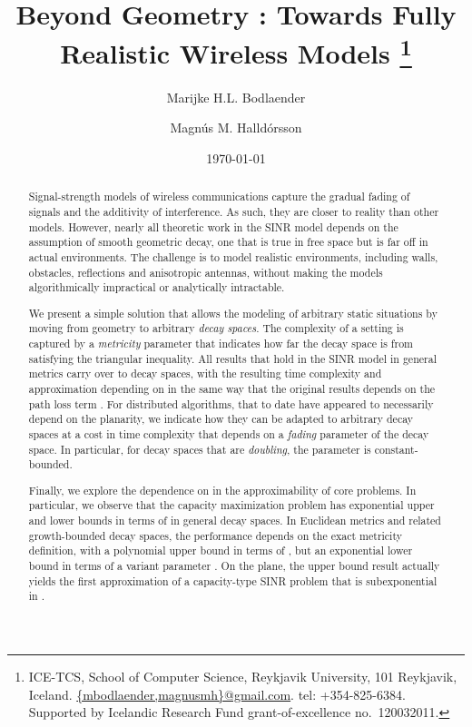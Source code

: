 \documentclass[11pt]{amsart}
\title{Beyond Geometry : Towards Fully Realistic Wireless Models
\thanks{ICE-TCS, School of Computer Science, Reykjavik University, 101 Reykjavik, Iceland. \url{
\{mbodlaender,magnusmh\}@gmail.com}. tel: +354-825-6384.
Supported by Icelandic Research Fund grant-of-excellence no.~120032011.}}
\author{Marijke H.L. Bodlaender \and Magn\'us M. Halld\'orsson}
\begin{document}
\begin{titlepage}

\date{\today}
\thispagestyle{empty}

\begin{abstract}
Signal-strength models of wireless communications capture the gradual
fading of signals and the additivity of interference. As such, they
are closer to reality than other models. However, nearly all theoretic
work in the SINR model depends on the assumption of smooth geometric
decay, one that is true in free space but is far off in actual
environments. The challenge is to model realistic environments,
including walls, obstacles, reflections and anisotropic antennas,
without making the models algorithmically impractical or analytically
intractable.

We present a simple solution that allows the modeling of arbitrary
static situations by moving from geometry to arbitrary \emph{decay
  spaces}.  The complexity of a setting is captured by a
\emph{metricity} parameter  that indicates how far the decay
space is from satisfying the triangular inequality.  All results that
hold in the SINR model in general metrics carry over to decay spaces,
with the resulting time complexity and approximation depending on
 in the same way that the original results depends on the path
loss term .  For distributed algorithms, that to date have
appeared to necessarily depend on the planarity, we indicate how they
can be adapted to arbitrary decay spaces at a cost in time complexity
that depends on a \emph{fading} parameter of the decay space. In
particular, for decay spaces that are \emph{doubling}, the parameter
is constant-bounded.

Finally, we explore the dependence on  in the approximability
of core problems. In particular, we observe that the capacity maximization problem 
has exponential upper and lower bounds in terms of  in general
decay spaces. In Euclidean metrics and related growth-bounded decay
spaces, the performance depends on the exact metricity definition, 
with a polynomial upper bound in terms of , but an exponential
lower bound in terms of a variant parameter .
On the plane, the upper bound result actually yields the first approximation of 
a capacity-type SINR problem that is subexponential in .
\end{abstract}

\maketitle

\vspace{4em}



\end{titlepage}
\end{document}
